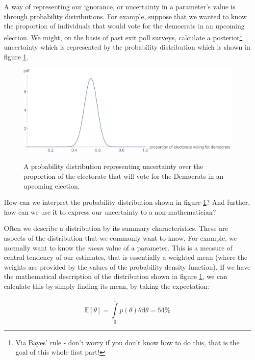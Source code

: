 \documentclass[11pt,fullpage]{book}
\begin{document}
A way of representing our ignorance, or uncertainty in a parameter's value is through probability distributions. For example, suppose that we wanted to know the proportion of individuals that would vote for the democrats in an upcoming election. We might, on the basis of past exit poll surveys, calculate a posterior\footnote{Via Bayes' rule - don't worry if you don't know how to do this, that is the goal of this whole first part!} uncertainty which is represented by the probability distribution which is shown in figure \ref{fig:Posterior_electionProportion}. 

\begin{figure}
\centering
\scalebox{0.5} 
{\includegraphics{Posterior_electionProportion.pdf}}
\caption{A probability distribution representing uncertainty over the proportion of the electorate that will vote for the Democrats in an upcoming election.}\label{fig:Posterior_electionProportion}
\end{figure}

How can we interpret the probability distribution shown in figure \ref{fig:Posterior_electionProportion}? And further, how can we use it to express our uncertainty to a non-mathematician? 

Often we describe a distribution by its summary characteristics. These are aspects of the distribution that we commonly want to know. For example, we normally want to know the \textit{mean} value of a parameter. This is a measure of central tendency of our estimates, that is essentially a weighted mean (where the weights are provided by the values of the probability density function). If we have the mathematical description of the distribution shown in figure \ref{fig:Posterior_electionProportion}, we can calculate this by simply finding its mean, by taking the expectation:

\begin{equation}
\mathbb{E}[\theta] = \int\limits_{0}^{1} p(\theta)\theta \mathrm{d}\theta = 54\%
\end{equation}
\end{document}
